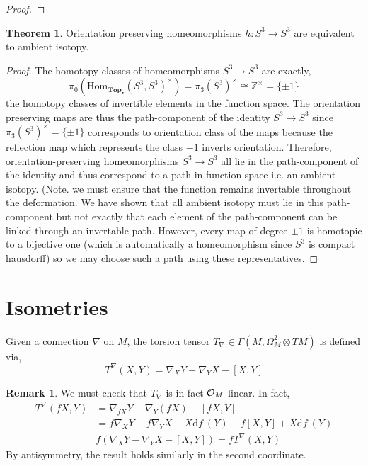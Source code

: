 \documentclass[12pt]{extarticle}
\newcommand{\Hom}[3]{\mathrm{Hom}_{#1}\left( #2, #3 \right)}
\newcommand{\Z}{\mathbb{Z}}
\renewcommand{\d}[1]{ \mathrm{d}#1 \:}
\theoremstyle{definition}
\newtheorem{theorem}{Theorem}[section]
\newtheorem{remark}{Remark}
\newenvironment{definition}[1][Definition:]{\begin{trivlist}
\item[\hskip \labelsep {\bfseries #1}]}{\end{trivlist}}
\begin{document}
\begin{proof}

\end{proof}

\begin{theorem}
Orientation preserving homeomorphisms $h : S^3 \to S^3$ are equivalent to ambient isotopy. 
\end{theorem}

\begin{proof}
The homotopy classes of homeomorphisms $S^3 \to S^3$ are exactly,
\[ \pi_0(\Hom{\mathbf{Top}_\bullet}{S^3}{S^3}^\times) = \pi_3(S^3)^\times \cong \Z^\times = \{ \pm 1 \} \]
the homotopy classes of invertible elements in the function space. The orientation preserving maps are thus the path-component of the identity $S^3 \to S^3$ since $\pi_3(S^3)^\times = \{\pm 1\}$ corresponds to orientation class of the maps because the reflection map which represents the class $-1$ inverts orientation. Therefore, orientation-preserving homeomorphisms $S^3 \to S^3$ all lie in the path-component of the identity and thus correspond to a path in function space i.e. an ambient isotopy. (Note. we must ensure that the function remains invertable throughout the deformation. We have shown that all ambient isotopy must lie in this path-component but not exactly that each element of the path-component can be linked through an invertable path. However, every map of degree $\pm 1$ is homotopic to a bijective one (which is automatically a homeomorphism since $S^3$ is compact hausdorff) so we may choose such a path using these representatives.  
\end{proof}

\section{Isometries}

\newcommand{\X}{\mathscr{X}}

\begin{definition}
Given a connection $\nabla$ on $M$, the torsion tensor $T_\nabla \in \Gamma(M, \Omega^{2}_M \otimes TM)$ is defined via,
\[ T^\nabla(X, Y) = \nabla_X Y - \nabla_Y X - [X, Y] \]
\end{definition}

\begin{remark}
We must check that $T_\nabla$ is in fact $\mathcal{O}_{M}$-linear. In fact,
\begin{align*}
T^\nabla(fX, Y) & = \nabla_{f X} Y - \nabla_Y (f X) - [f X, Y] 
\\
& = f \nabla_X Y - f \nabla_Y X - X \d{f}(Y) - f [X, Y] + X \d{f}(Y) 
\\
& f \left( \nabla_X Y - \nabla_Y X - [X, Y] \right) = f T^\nabla(X, Y)
\end{align*}
By antisymmetry, the result holds similarly in the second coordinate.
\end{remark}
\end{document}

